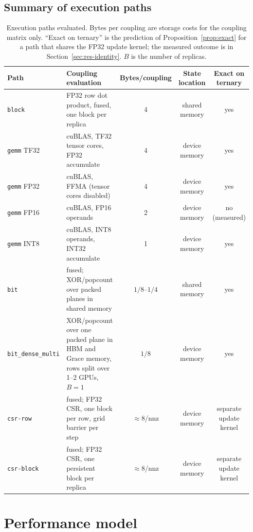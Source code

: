 \documentclass[11pt,a4paper]{article}
\newcommand{\code}[1]{\texttt{#1}}
\begin{document}
\subsection{Summary of execution paths}
\begin{table}[!ht]\centering\small
\caption{Execution paths evaluated. Bytes per coupling are storage costs for the coupling matrix only. ``Exact on ternary'' is the prediction of Proposition~\ref{prop:exact} for a path that shares the FP32 update kernel; the measured outcome is in Section~\ref{sec:res-identity}. $B$ is the number of replicas.}
\label{tab:paths}
\begin{tabularx}{\linewidth}{lXccc}\toprule
Path & Coupling evaluation & Bytes/coupling & State location & Exact on ternary \\
\midrule
\code{block}       & FP32 row dot product, fused, one block per replica     & 4     & shared memory   & yes \\
\code{gemm} TF32   & cuBLAS, TF32 tensor cores, FP32 accumulate             & 4     & device memory   & yes \\
\code{gemm} FP32   & cuBLAS, FFMA (tensor cores disabled)                   & 4     & device memory   & yes \\
\code{gemm} FP16   & cuBLAS, FP16 operands                                  & 2     & device memory   & no (measured) \\
\code{gemm} INT8   & cuBLAS, INT8 operands, INT32 accumulate                & 1     & device memory   & yes \\
\code{bit}         & fused; XOR/popcount over packed planes in shared memory & $1/8$--$1/4$ & shared memory & yes \\
\code{bit\_dense\_multi} & XOR/popcount over one packed plane in HBM and Grace memory, rows split over 1--2 GPUs, $B=1$ & $1/8$ & device memory & yes \\
\code{csr-row}     & fused; FP32 CSR, one block per row, grid barrier per step & $\approx 8$/nnz & device memory & separate update kernel \\
\code{csr-block}   & fused; FP32 CSR, one persistent block per replica & $\approx 8$/nnz & device memory & separate update kernel \\
\bottomrule
\end{tabularx}
\end{table}

\section{Performance model}\label{sec:model}
\end{document}
